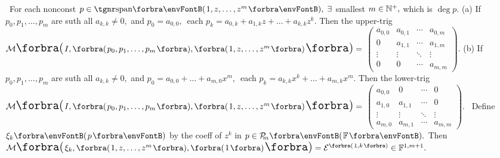 \BulletPointX{} \,\,\,For each nonconst $p\in\Span{1,z,\dots,z^m},\;\exists$ smallest $m\in{\mathbb{N}^+},$ which is $\deg p.$\TextB{}
(a) If $p_0,p_1,\dots,p_m$ are suth all $a_{k,k}\neq 0,$ and\TextB{}
\Hb $p_0=a_{0,0},\,$ each $p_k=a_{0,k}+a_{1,k}z+\dots+a_{k,k}z^k.$\TextB{\vspace{-18pt}}
\Ha Then the upper-trig $\Mt[\envFontLarge\BigPar]{\envFontDefault I,\Par{p_0,p_1,\dots,p_m},\Par{1,z,\dots,z^m}\envFontLarge}={}${\small$\begin{pmatrix}
		a_{0,0} & a_{0,1} & \cdots & a_{0,m}\\
		0       & a_{1,1} & \cdots & a_{1,m}\\
		\vdots  & \vdots  & \ddots & \vdots\\
		0       & 0       & \cdots & a_{m,m}
	\end{pmatrix}$}.\TextB{\vspace{-8pt}}
(b) If $p_0,p_1,\dots,p_m$ are suth all $a_{k,k}\neq 0,$ and\TextB{}
\Hb $p_0=a_{0,0}+\dots+a_{m,0}x^m,\,$ each $p_k=a_{k,k}x^k+\dots+a_{m,k}x^m.$\TextB{\vspace{-18pt}}
\Hb Then the lower-trig \;$\Mt[\envFontLarge\BigPar]{\envFontDefault I,\Par{p_0,p_1,\dots,p_m},\Par{1,z,\dots,z^m}\envFontLarge}={}${\small$\begin{pmatrix}
		a_{0,0} & 0       & \cdots & 0\\
		a_{1,0} & a_{1,1} & \cdots & 0\\
		\vdots  & \vdots  & \ddots & \vdots\\
		a_{m,0} & a_{m,1} & \cdots & a_{m,m}
	\end{pmatrix}$}.\TextB{\vspace{-12pt}}
\Comment \,\,\,Define $\xi_k\Par{p}$ by the coeff of $z^k$ in $p\in\PoF{m}.$\parCom\IndentB{}
Then $\Mt[\envFontLarge\BigPar]{\envFontDefault\xi_k,\Par{1,z,\dots,z^m},\Par{1}\envFontLarge}=\mathcal{E}^{\SmallPar[1pt]{1,k}}\in\Fbb^{1,m+1}.$\vspace{-2pt}
\SepLine\pagebreak


